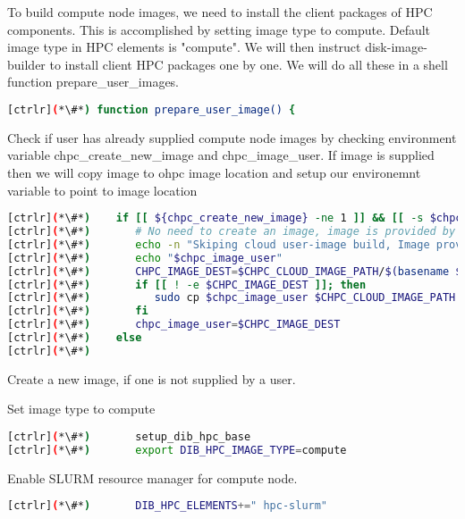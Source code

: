 	To build compute node images, we need to install the client packages of HPC components. This is accomplished by setting image type to compute. Default image type in HPC elements is "compute". We will then instruct disk-image-builder to install client HPC packages one by one. We will do all these in a shell function prepare\_user\_images.

\begin{lstlisting}[language=bash,keywords={}]
[ctrlr](*\#*) function prepare_user_image() {

\end{lstlisting} 

	Check if user has already supplied compute node images by checking environment variable chpc\_create\_new\_image and chpc\_image\_user. If image is supplied then we will copy image to ohpc image location and setup our environemnt variable to point to image location 
\begin{lstlisting}[language=bash,keywords={}]
[ctrlr](*\#*)    if [[ ${chpc_create_new_image} -ne 1 ]] && [[ -s $chpc_image_user ]]; then
[ctrlr](*\#*)       # No need to create an image, image is provided by user
[ctrlr](*\#*)       echo -n "Skiping cloud user-image build, Image provided:"
[ctrlr](*\#*)       echo "$chpc_image_user"
[ctrlr](*\#*)       CHPC_IMAGE_DEST=$CHPC_CLOUD_IMAGE_PATH/$(basename $chpc_image_user)
[ctrlr](*\#*)       if [[ ! -e $CHPC_IMAGE_DEST ]]; then
[ctrlr](*\#*)          sudo cp $chpc_image_user $CHPC_CLOUD_IMAGE_PATH
[ctrlr](*\#*)       fi
[ctrlr](*\#*)       chpc_image_user=$CHPC_IMAGE_DEST
[ctrlr](*\#*)    else
[ctrlr](*\#*)    

\end{lstlisting} 


	Create a new image, if one is not supplied by a user. 	
	
	Set image type to compute  

\begin{lstlisting}[language=bash,keywords={}]
[ctrlr](*\#*)       setup_dib_hpc_base
[ctrlr](*\#*)       export DIB_HPC_IMAGE_TYPE=compute
\end{lstlisting} 

	Enable SLURM resource manager for compute node.


\begin{lstlisting}[language=bash,keywords={}]
[ctrlr](*\#*)       DIB_HPC_ELEMENTS+=" hpc-slurm"
\end{lstlisting} 

